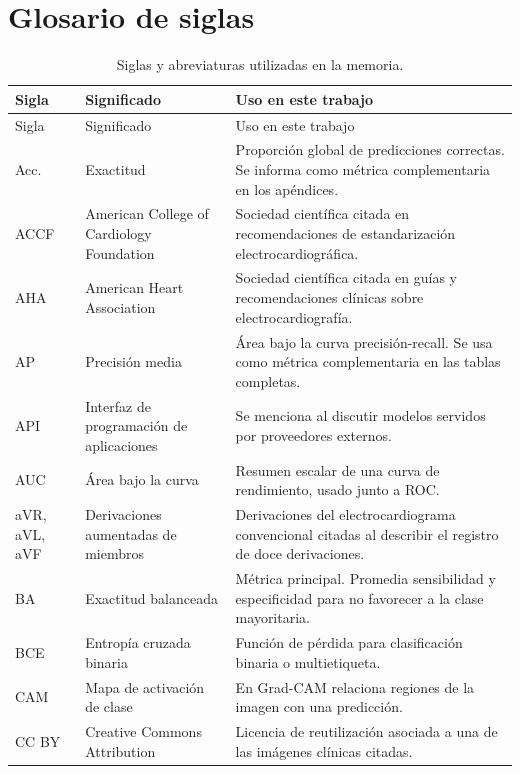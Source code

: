 \chapter*{Glosario de siglas}



{\small
\begin{longtable}{@{}>{\raggedright\arraybackslash}p{2.20cm}>{\raggedright\arraybackslash}p{4.10cm}>{\raggedright\arraybackslash}p{7.95cm}@{}}
\caption{Siglas y abreviaturas utilizadas en la memoria.}
\label{tab:glosario_siglas}\\
\toprule
Sigla & Significado & Uso en este trabajo \\
\midrule
\endfirsthead
\toprule
Sigla & Significado & Uso en este trabajo \\
\midrule
\endhead
\bottomrule
\endfoot
Acc. & Exactitud & Proporción global de predicciones correctas. Se informa como métrica complementaria en los apéndices. \\
ACCF & American College of Cardiology Foundation & Sociedad científica citada en recomendaciones de estandarización electrocardiográfica. \\
AHA & American Heart Association & Sociedad científica citada en guías y recomendaciones clínicas sobre electrocardiografía. \\
AP & Precisión media & Área bajo la curva precisión-recall. Se usa como métrica complementaria en las tablas completas. \\
API & Interfaz de programación de aplicaciones & Se menciona al discutir modelos servidos por proveedores externos. \\
AUC & Área bajo la curva & Resumen escalar de una curva de rendimiento, usado junto a ROC. \\
aVR, aVL, aVF & Derivaciones aumentadas de miembros & Derivaciones del electrocardiograma convencional citadas al describir el registro de doce derivaciones. \\
BA & Exactitud balanceada & Métrica principal. Promedia sensibilidad y especificidad para no favorecer a la clase mayoritaria. \\
BCE & Entropía cruzada binaria & Función de pérdida para clasificación binaria o multietiqueta. \\
CAM & Mapa de activación de clase & En Grad-CAM relaciona regiones de la imagen con una predicción. \\
CC BY & Creative Commons Attribution & Licencia de reutilización asociada a una de las imágenes clínicas citadas. \\

\end{longtable}}
